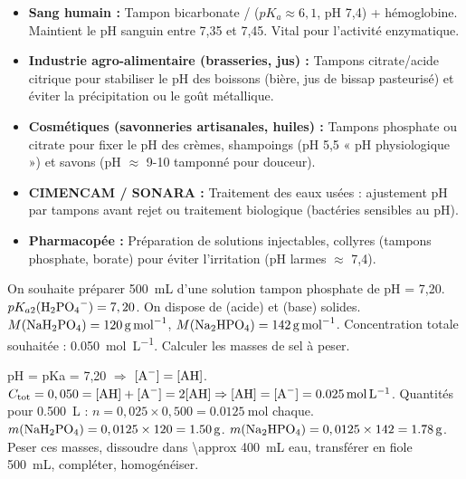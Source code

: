 \documentclass[11pt]{article}
\begin{document}
\begin{savaistu}
\begin{itemize}
  \item \textbf{Sang humain :} Tampon bicarbonate / ($pK_a \approx 6,1$, pH 7,4) + hémoglobine. Maintient le pH sanguin entre 7,35 et 7,45. Vital pour l'activité enzymatique.
  \item \textbf{Industrie agro-alimentaire (brasseries, jus) :} Tampons citrate/acide citrique pour stabiliser le pH des boissons (bière, jus de bissap pasteurisé) et éviter la précipitation ou le goût métallique.
  \item \textbf{Cosmétiques (savonneries artisanales, huiles) :} Tampons phosphate ou citrate pour fixer le pH des crèmes, shampoings (pH 5,5 « pH physiologique ») et savons (pH $\approx$ 9-10 tamponné pour douceur).
  \item \textbf{CIMENCAM / SONARA :} Traitement des eaux usées : ajustement pH par tampons avant rejet ou traitement biologique (bactéries sensibles au pH).
  \item \textbf{Pharmacopée :} Préparation de solutions injectables, collyres (tampons phosphate, borate) pour éviter l'irritation (pH larmes $\approx$ 7,4).
\end{itemize}
\end{savaistu}

\begin{exercice}
On souhaite préparer \SI{500}{\mL} d'une solution tampon phosphate de pH = 7,20. $pK_{a2}(\ce{H2PO4-}) = 7,20$. On dispose de  (acide) et  (base) solides. $M(\ce{NaH2PO4}) = \SI{120}{\gram\per\mol}$, $M(\ce{Na2HPO4}) = \SI{142}{\gram\per\mol}$. Concentration totale souhaitée : \SI{0,050}{\mol\per\L}.
Calculer les masses de sel à peser.
\end{exercice}

\begin{corrige}
pH = pKa = 7,20 $\Rightarrow$ $[\ce{A-}] = [\ce{AH}]$.
$C_{\text{tot}} = 0,050 = [\ce{AH}] + [\ce{A-}] = 2[\ce{AH}] \Rightarrow [\ce{AH}] = [\ce{A-}] = \SI{0,025}{\mol\per\L}$.
Quantités pour \SI{0,500}{\L} : $n = 0,025 \times 0,500 = \SI{0,0125}{\mol}$ chaque.
$m(\ce{NaH2PO4}) = 0,0125 \times 120 = \mathbf{\SI{1,50}{\gram}}$.
$m(\ce{Na2HPO4}) = 0,0125 \times 142 = \mathbf{\SI{1,78}{\gram}}$.
Peser ces masses, dissoudre dans \SI{\approx 400}{\mL} eau, transférer en fiole \SI{500}{\mL}, compléter, homogénéiser.
\end{corrige}
\end{document}
